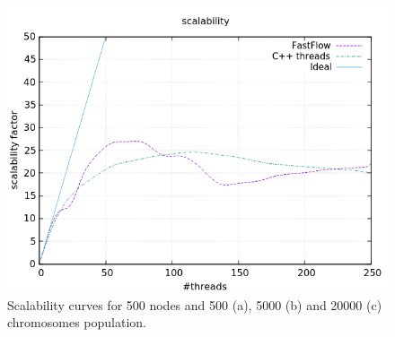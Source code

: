 \documentclass[a4paper,10pt]{article}
\begin{document}
\begin{figure}[H]
\begin{minipage}[t]{0.32\linewidth}
				\subcaption{}
			\end{minipage}
			\begin{minipage}[t]{0.32\linewidth}
				\includegraphics[width=\linewidth]{BenchMarkTSP/scalability/500/SC50020000_zoom.png}
				\subcaption{}
			\end{minipage}
			\caption{Scalability curves for 500 nodes and 500 (a), 5000 (b) and 20000 (c) chromosomes population.}
			\label{500s}
		\end{figure}
	
\end{document}
